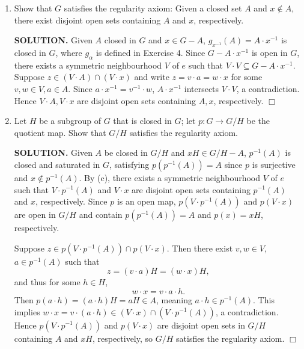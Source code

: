 \documentclass{article}
\begin{document}
\begin{enumerate}
\begin{enumerate}
        \item Show that $G$ satisfies the regularity axiom: Given a closed set $A$ and $x \notin A$, there exist disjoint open sets containing $A$ and $x$, respectively.

        {\bf SOLUTION.} Given $A$ closed in $G$ and $x \in G - A$, $g_{x^{-1}}(A) = A \cdot x^{-1}$ is closed in $G$, where $g_\alpha$ is defined in Exercise 4. Since $G - A \cdot x^{-1}$ is open in $G$, there exists a symmetric neighbourhood $V$ of $e$ such that $V \cdot V \subseteq G - A \cdot x^{-1}$. Suppose $z \in (V \cdot A) \cap (V \cdot x)$ and write $z = v \cdot a = w \cdot x$ for some $v, w \in V, a \in A$. Since $a \cdot x^{-1} = v^{-1} \cdot w$, $A \cdot x^{-1}$ intersects $V \cdot V$, a contradiction. Hence $V \cdot A, V \cdot x$ are disjoint open sets containing $A, x$, respectively. $\Box$

        \item Let $H$ be a subgroup of $G$ that is closed in $G$; let $p: G \rightarrow G / H$ be the quotient map. Show that $G / H$ satisfies the regularity axiom.

        {\bf SOLUTION.} Given $A$ be closed in $G / H$ and $xH \in G / H - A$, $p^{-1}(A)$ is closed and saturated in $G$, satisfying $p(p^{-1}(A)) = A$ since $p$ is surjective and $x \notin p^{-1}(A)$. By (c), there exists a symmetric neighbourhood $V$ of $e$ such that $V \cdot p^{-1}(A)$ and $V \cdot x$ are disjoint open sets containing $p^{-1}(A)$ and $x$, respectively. Since $p$ is an open map, $p(V \cdot p^{-1}(A))$ and $p(V \cdot x)$ are open in $G / H$ and contain $p(p^{-1}(A)) = A$ and $p(x) = xH$, respectively.

        Suppose $z \in p(V \cdot p^{-1}(A)) \cap p(V \cdot x)$. Then there exist $v, w \in V$, $a \in p^{-1}(A)$ such that
        $$z = (v \cdot a)H = (w \cdot x)H,$$
        and thus for some $h \in H$,
        $$w \cdot x = v \cdot a \cdot h.$$
        Then $p(a \cdot h) = (a \cdot h)H = aH \in A$, meaning $a \cdot h \in p^{-1}(A)$. This implies $w \cdot x = v \cdot (a \cdot h) \in (V \cdot x) \cap (V \cdot p^{-1}(A))$, a contradiction. Hence $p(V \cdot p^{-1}(A))$ and $p(V \cdot x)$ are disjoint open sets in $G / H$ containing $A$ and $xH$, respectively, so $G / H$ satisfies the regularity axiom. $\Box$
    \end{enumerate}
\end{enumerate}
\end{document}
